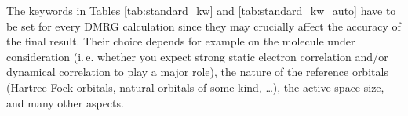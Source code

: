 \documentclass[bibliography=totoc,12pt,a4paper]{scrartcl}
\newcommand{\mol}{\textsc{OpenMolcas}}
\newcommand{\qcm}{\textsc{QCMaquis}}
\begin{document}
The keywords in Tables \ref{tab:standard_kw} and \ref{tab:standard_kw_auto} have to be set for every DMRG calculation since they may crucially affect the accuracy of the final result.
Their choice depends for example on the molecule under consideration (i.\,e. whether you expect strong static electron correlation and/or dynamical correlation to play a major role), the nature of the reference orbitals (Hartree-Fock orbitals, natural orbitals of some kind, \ldots), the active space size, and many other aspects.

\end{document}

